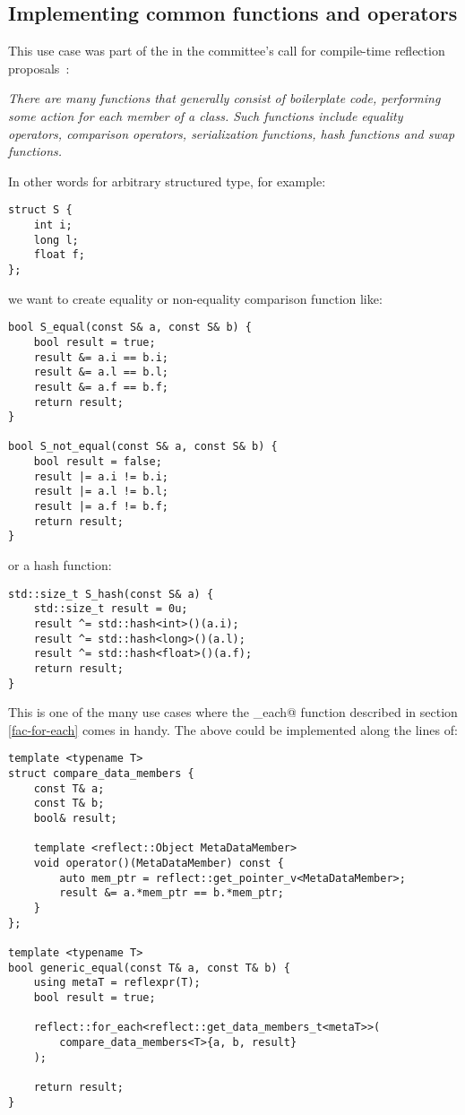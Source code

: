 \subsection{Implementing common functions and operators}
\label{use-case-common-func}

This use case was part of the  in the committee's
call for compile-time reflection proposals~\cite{ISOCPP-N3814}: 

{\em There are many functions that generally consist of boilerplate code,
performing some action for each member of a class. Such functions include
equality operators, comparison operators, serialization functions,
hash functions and swap functions.
}

In other words for arbitrary structured type, for example:

\begin{verbatim}
struct S {
	int i;
	long l;
	float f;
};
\end{verbatim}

we want to create equality or non-equality comparison function like:

\begin{verbatim}
bool S_equal(const S& a, const S& b) {
	bool result = true;
	result &= a.i == b.i;
	result &= a.l == b.l;
	result &= a.f == b.f;
	return result;
}

bool S_not_equal(const S& a, const S& b) {
	bool result = false;
	result |= a.i != b.i;
	result |= a.l != b.l;
	result |= a.f != b.f;
	return result;
}
\end{verbatim}

or a hash function:

\begin{verbatim}
std::size_t S_hash(const S& a) {
	std::size_t result = 0u;
	result ^= std::hash<int>()(a.i);
	result ^= std::hash<long>()(a.l);
	result ^= std::hash<float>()(a.f);
	return result;
}
\end{verbatim}

This is one of the many use cases where the \verb@for_each@ function
described in section \ref{fac-for-each} comes in handy. The above could be
implemented along the lines of:

\begin{verbatim}
template <typename T>
struct compare_data_members {
	const T& a;
	const T& b;
	bool& result;

	template <reflect::Object MetaDataMember>
	void operator()(MetaDataMember) const {
		auto mem_ptr = reflect::get_pointer_v<MetaDataMember>;
		result &= a.*mem_ptr == b.*mem_ptr;
	}
};

template <typename T>
bool generic_equal(const T& a, const T& b) {
	using metaT = reflexpr(T);
	bool result = true;

	reflect::for_each<reflect::get_data_members_t<metaT>>(
		compare_data_members<T>{a, b, result}
	);

	return result;
}
\end{verbatim}

